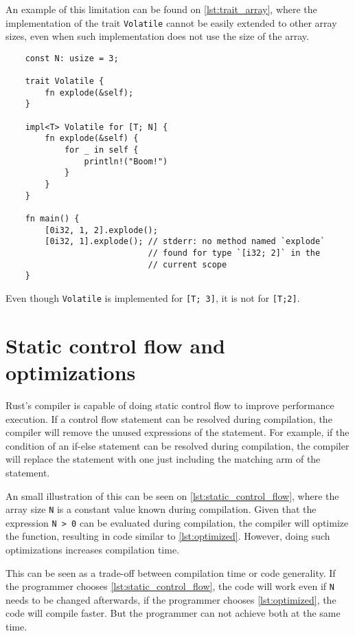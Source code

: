An example of this limitation can be found on \ref{lst:trait_array}, where the implementation of the trait \texttt{Volatile} cannot be easily extended to other array sizes, even when such implementation does not use the size of the array. 

\begin{listing}
	\begin{verbatim} 
    const N: usize = 3;

    trait Volatile {
        fn explode(&self);
    }

    impl<T> Volatile for [T; N] {
        fn explode(&self) {
            for _ in self {
                println!("Boom!")
            }
        }
    }

    fn main() {
        [0i32, 1, 2].explode(); 
        [0i32, 1].explode(); // stderr: no method named `explode` 
                             // found for type `[i32; 2]` in the
                             // current scope
    }
	\end{verbatim}
    \caption{Even though \texttt{Volatile} is implemented for \texttt{[T; 3]}, it is not for \texttt{[T;2]}.}
  \label{lst:trait_array}
\end{listing}

\section{Static control flow and optimizations}
Rust's compiler is capable of doing static control flow to improve performance execution. If a control flow statement can be resolved during compilation, the compiler will remove the unused expressions of the statement. For example, if the condition of an if-else statement can be resolved during compilation, the compiler will replace the statement with one just including the matching arm of the statement.

An small illustration of this can be seen on \ref{lst:static_control_flow}, where the array size \texttt{N} is a constant value known during compilation. Given that the expression  \texttt{N > 0} can be evaluated during compilation, the compiler will optimize the function, resulting in code similar to \ref{lst:optimized}. However, doing such optimizations increases compilation time. 

This can be seen as a trade-off between compilation time or code generality. If the programmer chooses \ref{lst:static_control_flow}, the code will work even if \texttt{N} needs to be changed afterwards, if the programmer chooses \ref{lst:optimized}, the code will compile faster. But the programmer can not achieve both at the same time.


